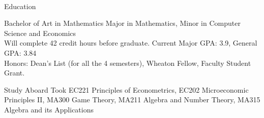 \documentclass[]{resume-knyte}
\begin{document}



\begin{subheader}{1}
    \\

\end{subheader}

\begin{topic}{Education}


    {Bachelor of Art in Mathematics}
    {Major in Mathematics, Minor in Computer Science and Economics\\
    Will complete 42 credit hours before graduate. Current Major GPA: 3.9, General GPA: 3.84\\
    Honors: Dean's List (for all the 4 semesters), Wheaton Fellow, Faculty Student Grant.}


    {Study Aboard}
    {Took EC221 Principles of Econometrics, EC202 Microeconomic Principles II,
    MA300 Game Theory, MA211 Algebra and Number Theory, MA315 Algebra and its Applications
    }

    \\ %
\end{topic}
\end{document}
